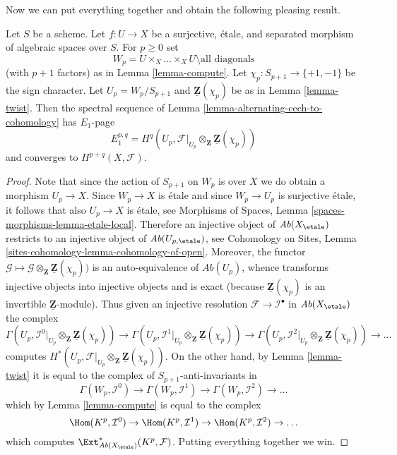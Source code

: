 \noindent
Now we can put everything together and obtain the following
pleasing result.

\begin{lemma}
\label{lemma-alternating-spectral-sequence}
Let $S$ be a scheme. Let $f : U \to X$ be a surjective, \'etale, and
separated morphism of algebraic spaces over $S$. For $p \geq 0$ set
$$
W_p = U \times_X \ldots \times_X U \setminus \text{all diagonals}
$$
(with $p + 1$ factors) as in Lemma \ref{lemma-compute}.
Let $\chi_p : S_{p + 1} \to \{+1, -1\}$ be the sign character.
Let $U_p = W_p/S_{p + 1}$ and $\underline{\mathbf{Z}}(\chi_p)$ be as in
Lemma \ref{lemma-twist}.
Then the spectral sequence of
Lemma \ref{lemma-alternating-cech-to-cohomology}
has $E_1$-page
$$
E_1^{p, q} =
H^q(U_p, \mathcal{F}|_{U_p} \otimes_\mathbf{Z} \underline{\mathbf{Z}}(\chi_p))
$$
and converges to $H^{p + q}(X, \mathcal{F})$.
\end{lemma}

\begin{proof}
Note that since the action of $S_{p + 1}$ on $W_p$ is over $X$ we do
obtain a morphism $U_p \to X$. Since $W_p \to X$ is \'etale and since
$W_p \to U_p$ is surjective \'etale, it follows
that also $U_p \to X$ is \'etale, see
Morphisms of Spaces, Lemma \ref{spaces-morphisms-lemma-etale-local}.
Therefore an injective object of
$\textit{Ab}(X_\etale)$ restricts to an injective object of
$\textit{Ab}(U_{p, \etale})$, see
Cohomology on Sites, Lemma \ref{sites-cohomology-lemma-cohomology-of-open}.
Moreover, the functor
$\mathcal{G} \mapsto
\mathcal{G} \otimes_\mathbf{Z} \underline{\mathbf{Z}}(\chi_p))$
is an auto-equivalence of $\textit{Ab}(U_p)$, whence transforms injective
objects into injective objects and is exact (because
$\underline{\mathbf{Z}}(\chi_p)$ is an invertible
$\underline{\mathbf{Z}}$-module). Thus given an injective resolution
$\mathcal{F} \to \mathcal{I}^\bullet$ in $\textit{Ab}(X_\etale)$
the complex
$$
\Gamma(U_p,
\mathcal{I}^0|_{U_p} \otimes_\mathbf{Z} \underline{\mathbf{Z}}(\chi_p))
\to
\Gamma(U_p,
\mathcal{I}^1|_{U_p} \otimes_\mathbf{Z} \underline{\mathbf{Z}}(\chi_p))
\to
\Gamma(U_p,
\mathcal{I}^2|_{U_p} \otimes_\mathbf{Z} \underline{\mathbf{Z}}(\chi_p))
\to \ldots
$$
computes
$H^*(U_p,
\mathcal{F}|_{U_p} \otimes_\mathbf{Z} \underline{\mathbf{Z}}(\chi_p))$.
On the other hand, by
Lemma \ref{lemma-twist}
it is equal to the complex of $S_{p + 1}$-anti-invariants in
$$
\Gamma(W_p, \mathcal{I}^0) \to
\Gamma(W_p, \mathcal{I}^1) \to
\Gamma(W_p, \mathcal{I}^2) \to \ldots
$$
which by
Lemma \ref{lemma-compute}
is equal to the complex
$$
\Hom(K^p, \mathcal{I}^0) \to
\Hom(K^p, \mathcal{I}^1) \to
\Hom(K^p, \mathcal{I}^2) \to \ldots
$$
which computes
$\Ext^*_{\textit{Ab}(X_\etale)}(K^p, \mathcal{F})$.
Putting everything together we win.
\end{proof}





